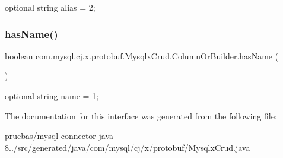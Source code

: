 {\ttfamily optional string alias = 2;} \mbox{\label{interfacecom_1_1mysql_1_1cj_1_1x_1_1protobuf_1_1_mysqlx_crud_1_1_column_or_builder_aa8143600edda62e2600f685253240a17}} 
\subsubsection{\texorpdfstring{has\+Name()}{hasName()}}
{\footnotesize\ttfamily boolean com.\+mysql.\+cj.\+x.\+protobuf.\+Mysqlx\+Crud.\+Column\+Or\+Builder.\+has\+Name (\begin{DoxyParamCaption}{ }\end{DoxyParamCaption})}

{\ttfamily optional string name = 1;} 

The documentation for this interface was generated from the following file\+:\begin{DoxyCompactItemize}
\item 
pruebas/mysql-\/connector-\/java-\/8../src/generated/java/com/mysql/cj/x/protobuf/Mysqlx\+Crud.\+java\end{DoxyCompactItemize}
